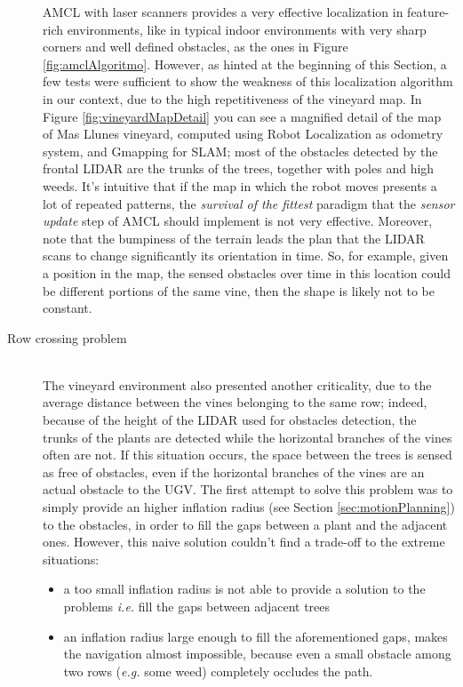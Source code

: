 \begin{description}
\ac{AMCL} with laser scanners provides a very effective localization in feature-rich environments, like in typical indoor environments with very sharp corners and well defined obstacles, as the ones in Figure \ref{fig:amclAlgoritmo}.
However, as hinted at the beginning of this Section, a few tests were sufficient to show the weakness of this localization algorithm in our context, due to the high repetitiveness of the vineyard map. In Figure \ref{fig:vineyardMapDetail} you can see a magnified detail of the map of Mas Llunes vineyard, computed using Robot Localization as odometry system, and Gmapping for \ac{SLAM}; most of the obstacles detected by the frontal \ac{LIDAR} are the trunks of the trees, together with poles and high weeds.
 It's intuitive that if the map in which the robot moves presents a lot of repeated patterns, the \textit{survival of the fittest} paradigm that the \textit{sensor update} step of \ac{AMCL} should implement is not very effective. Moreover, note that the bumpiness of the terrain leads the plan that the \ac{LIDAR} scans to change significantly its orientation in time. So, for example, given a position in the map, the sensed obstacles over time in this location could be different portions of the same vine, then the shape is likely not to be constant.

\item[Row crossing problem] \hfill \\
The vineyard environment also presented another criticality, due to the average distance between the vines belonging to the same row; indeed, because of the height of the \ac{LIDAR} used for obstacles detection, the trunks of the plants are detected while the horizontal branches of the vines often are not.
If this situation occurs, the space between the trees is sensed as free of obstacles, even if the horizontal branches of the vines are an actual obstacle to the \ac{UGV}. The first attempt to solve this problem was to simply provide an higher inflation radius (see Section \ref{sec:motionPlanning}) to the obstacles, in order to fill the gaps between a plant and the adjacent ones. However, this naive solution couldn't find a trade-off to the extreme situations:
\begin{itemize}
	\item a too small inflation radius is not able to provide a solution to the problems \textit{i.e.} fill the gaps between adjacent trees
	\item an inflation radius large enough to fill the aforementioned gaps, makes the navigation almost impossible, because even a small obstacle among two rows (\textit{e.g.} some weed) completely occludes the path.
\end{itemize}

\end{description}

